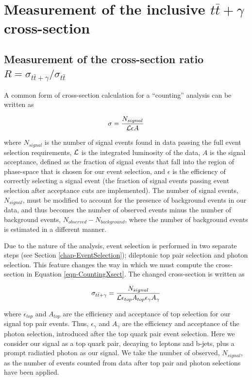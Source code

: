 \chapter{Measurement of the inclusive $t\bar{t}+\gamma$ cross-section}\label{chap-crosssection}

\section{Measurement of the cross-section ratio $R = \sigma_{t\bar{t}+\gamma}/\sigma_{t\bar{t}}$}

A common form of cross-section calculation for a ``counting'' analysis can be written as

\begin{equation} \label{eqn-CountingXsect}
\sigma = \frac{N_{signal}}{\mathcal{L} \epsilon A}
\end{equation}

where $N_{signal}$ is the number of signal events found in data passing the full event selection requirements, $\mathcal{L}$ is the integrated luminosity of the data, $A$ is the signal acceptance, defined as the fraction of signal events that fall into the region of phase-space that is chosen for our event selection, and $\epsilon$ is the efficiency of correctly selecting a signal event (the fraction of signal events passing event selection after acceptance cuts are implemented). The number of signal events, $N_{signal}$, must be modified to account for the presence of background events in our data, and thus becomes the number of observed events minus the number of background events, $N_{observed} - N_{background}$, where the number of background events is estimated in a different manner. 

Due to the nature of the analysis, event selection is performed in two separate steps (see Section \ref{chap-EventSelection}); dileptonic top pair selection and photon selection. This feature changes the way in which we must compute the cross-section in Equation \ref{eqn-CountingXsect}. The changed cross-section is written as

\begin{equation}
\sigma_{t\bar{t}+\gamma} = \frac{N_{signal}}{\mathcal{L} \epsilon_{top} A_{top} \epsilon_{\gamma} A_{\gamma}}
\end{equation}

where $\epsilon_{top}$ and $A_{top}$ are the efficiency and acceptance of top selection for our signal top pair events. Thus, $\epsilon_{\gamma}$ and $A_{\gamma}$ are the efficiency and acceptance of the photon selection, introduced after the top quark pair event selection. Here we consider our signal as a top quark pair, decaying to leptons and b-jets, plus a prompt radiatied photon as our signal. We take the number of observed, $N_{signal}$, as the number of events counted from data after top pair and photon selections have been applied.

